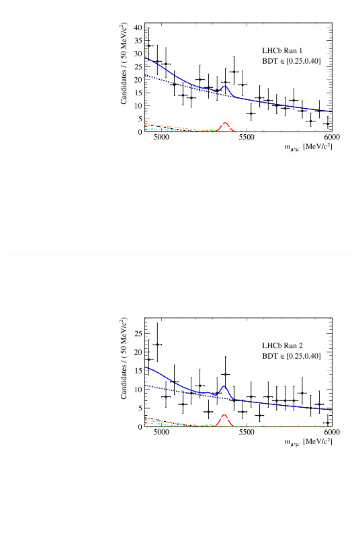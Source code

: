{\begin{figure}[tbp]
    \centering
    \begin{subfigure}[b]{0.48\textwidth}
        \includegraphics[width=\textwidth]{./Figs/BFAnalysis/Fig17a.pdf}
    \end{subfigure}
    ~ %
    \begin{subfigure}[b]{0.48\textwidth}
       \includegraphics[width=\textwidth]{./Figs/BFAnalysis/Fig17e.pdf}
    \end{subfigure}
    \begin{subfigure}[b]{0.48\textwidth}

\end{subfigure}
\end{figure}}
